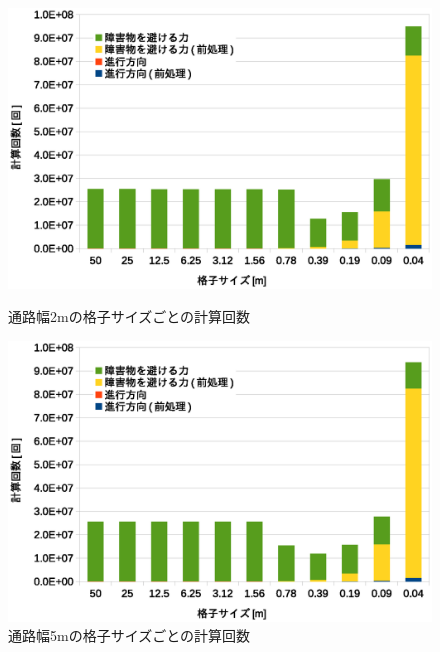 \begin{figure}[tb]
	\begin{minipage}[b]{0.48\columnwidth}
		\begin{center}
		\includegraphics[width=\columnwidth]{figure/5_result_2m_times.eps}
		\caption{通路幅2mの格子サイズごとの計算回数}
		\label{fig:result_2m_times}
		\end{center}
	\end{minipage}
	\hspace{0.04\columnwidth}
	\begin{minipage}[b]{0.48\columnwidth}
		\begin{center}
		\includegraphics[width=\columnwidth]{figure/5_result_5m_times.eps}
		\caption{通路幅5mの格子サイズごとの計算回数}
		\label{fig:result_5m_times}
		\end{center}
	\end{minipage}
\end{figure}

